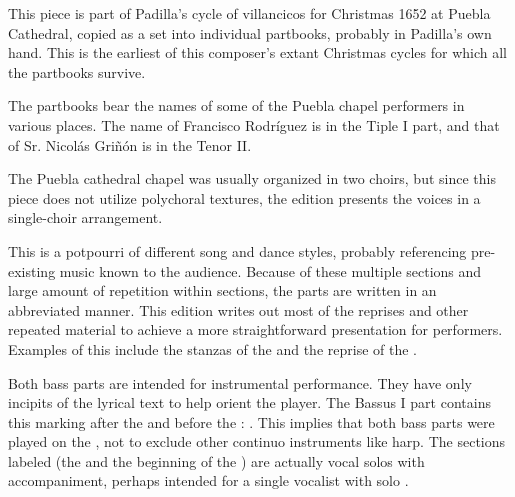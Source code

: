 
\begin{notesources}

\begin{source}
\end{source}

\end{notesources}

This piece is part of Padilla's cycle of villancicos for Christmas 1652 at Puebla Cathedral, copied as a set into individual partbooks, probably in Padilla's own hand.
This is the earliest of this composer's extant Christmas cycles for which all the partbooks survive.

The partbooks bear the names of some of the Puebla chapel performers in various places.
The name of Francisco Rodríguez is in the Tiple I part, and that of Sr. Nicolás Griñón is in the Tenor II.


The Puebla cathedral chapel was usually organized in two choirs, but since this piece does not utilize polychoral textures, the edition presents the voices in a single-choir arrangement.

This  is a potpourri of different song and dance styles, probably referencing pre-existing music known to the audience.
Because of these multiple sections and large amount of repetition within sections, the parts are written in an abbreviated manner.
This edition writes out most of the reprises and other repeated material to achieve a more straightforward presentation for performers.
Examples of this include the stanzas of the  and the  reprise of the .



Both bass parts are intended for instrumental performance.
They have only incipits of the lyrical text to help orient the player.
The Bassus I part contains this marking after the  and before the : .
This implies that both bass parts were played on the , not to exclude other continuo instruments like harp.
The sections labeled  (the  and the beginning of the ) are actually vocal solos with accompaniment, perhaps intended for a single vocalist with solo .

